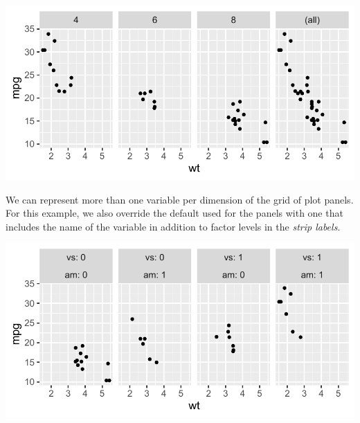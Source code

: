 \documentclass[krantz2]{krantz}\usepackage{knitr}
\begin{document}
\begin{knitrout}\footnotesize
{}\color{fgcolor}\begin{kframe}
\begin{alltt}
 \hlopt{+} \hlstd{(} \hlstd{=}   \hlstd{=} \hlstd{)}
\end{alltt}
\end{kframe}

{\centering \includegraphics[width=.7\textwidth]{figure/pos-facets-06-1}

}



\end{knitrout}

We can represent more than one variable per dimension of the grid of plot panels. For this example, we also override the default  used for the panels with one that includes the name of the variable in addition to factor levels in the \emph{strip labels}.

\begin{knitrout}\footnotesize
{}\color{fgcolor}\begin{kframe}
\begin{alltt}
 \hlopt{+} \hlstd{(} \hlstd{=}   
\end{alltt}
\end{kframe}

{\centering \includegraphics[width=.7\textwidth]{figure/pos-facets-07-1}

}



\end{knitrout}
\end{document}
